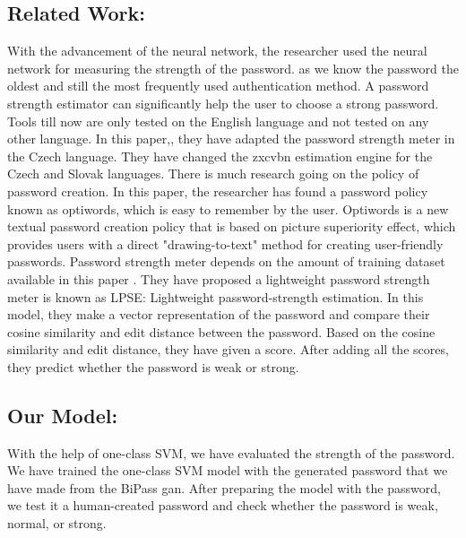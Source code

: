\documentclass[runningheads]{llncs}
\begin{document}
\subsection{Related Work:}
With the advancement of the neural network, the researcher used the neural network for measuring the strength of the password.\cite{197243} as we know the password the oldest and still the most frequently used authentication method. A password strength estimator can significantly help the user to choose a strong password. Tools till now are only tested on the English language and not tested on any other language. In this paper,\cite{article}, they have adapted the password strength meter in the Czech language. They have changed the zxcvbn estimation engine for the Czech and Slovak languages.
There is much research going on the policy of password creation. In this paper, \cite{GUO2019423}the researcher has found a password policy known as optiwords, which is easy to remember by the user.  Optiwords is a new textual password creation policy that is based on picture superiority effect, which provides users with a direct "drawing-to-text" method for creating user-friendly passwords. Password strength meter depends on the amount of training dataset available in this paper \cite{Guo2018LPSELP}. They have proposed a lightweight password strength meter is known as LPSE: Lightweight password-strength estimation. In this model, they make a vector representation of the password and compare their cosine similarity and edit distance between the password. Based on the cosine similarity and edit distance, they have given a score. After adding all the scores, they predict whether the password is weak or strong.
\subsection{Our Model:}
With the help of one-class SVM, we have evaluated the strength of the password. We have trained the one-class SVM model\cite{1437839} with the generated password that we have made from the BiPass gan. After preparing the model with the password, we test it a human-created password and check whether the password is weak, normal, or strong.
\newline
\hfill \break
\end{document}
